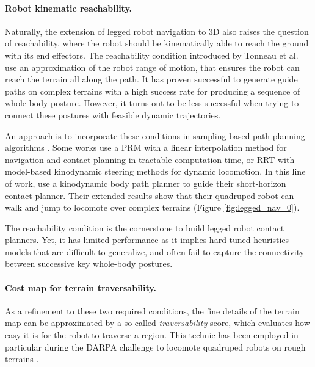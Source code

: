 

\paragraph{Robot kinematic reachability.}
Naturally, the extension of legged robot navigation to 3D also raises the question of reachability, where the robot should be kinematically able to reach the ground with its end effectors.
The reachability condition introduced by Tonneau et al. \cite{RB-PRM} use an approximation of the robot range of motion, that ensures the robot can reach the terrain all along the path. It has proven successful to generate guide paths on complex terrains with a high success rate for producing a sequence of whole-body posture. However, it turns out to be less successful when trying to connect these postures with feasible dynamic trajectories.

An approach is to incorporate these conditions in sampling-based path planning algorithms \cite{sl1m_v2}.
Some works use a PRM with a linear interpolation method \cite{AcyclicCP} for navigation and contact planning in tractable computation time, or RRT with model-based kinodynamic steering methods \cite{kinodynamic_sm_2017} for dynamic locomotion.
In this line of work, \cite{norby_2020} use a kinodynamic body path planner to guide their short-horizon contact planner. Their extended results show that their quadruped robot can walk and jump to locomote over complex terrains \cite{norby_skd_2022}(Figure \ref{fig:legged_nav_0}).

The reachability condition is the cornerstone to build legged robot contact planners.
Yet, it has limited performance as it implies hard-tuned heuristics models that are difficult to generalize, and often fail to capture the connectivity between successive key whole-body postures. %



\paragraph{Cost map for terrain traversability.}
As a refinement to these two required conditions, the fine details of the terrain map can be approximated by a so-called \textit{traversability} score, which evaluates how easy it is for the robot to traverse a region. This technic has been employed in particular during the DARPA challenge to locomote quadruped robots on rough terrains \cite{darpa_hutter_2022}. 

